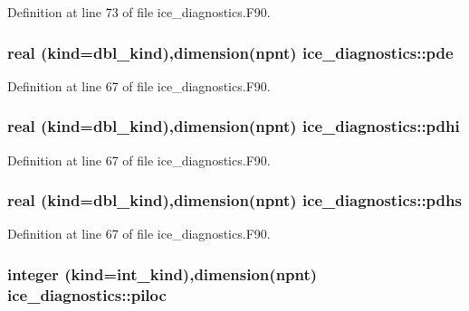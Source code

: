 Definition at line 73 of file ice\_\-diagnostics.F90.\hypertarget{namespaceice__diagnostics_afaeca519ef7de2238cb47f6f1b6c3032}{
\subsubsection[{pde}]{\setlength{\rightskip}{0pt plus 5cm}real (kind=dbl\_\-kind),dimension({\bf npnt}) {\bf ice\_\-diagnostics::pde}}}
\label{namespaceice__diagnostics_afaeca519ef7de2238cb47f6f1b6c3032}


Definition at line 67 of file ice\_\-diagnostics.F90.\hypertarget{namespaceice__diagnostics_ae9176a1e4ff6d526241dfbc185fef462}{
\subsubsection[{pdhi}]{\setlength{\rightskip}{0pt plus 5cm}real (kind=dbl\_\-kind),dimension({\bf npnt}) {\bf ice\_\-diagnostics::pdhi}}}
\label{namespaceice__diagnostics_ae9176a1e4ff6d526241dfbc185fef462}


Definition at line 67 of file ice\_\-diagnostics.F90.\hypertarget{namespaceice__diagnostics_aafb0c3e7a68ebfdd564e56305618c799}{
\subsubsection[{pdhs}]{\setlength{\rightskip}{0pt plus 5cm}real (kind=dbl\_\-kind),dimension({\bf npnt}) {\bf ice\_\-diagnostics::pdhs}}}
\label{namespaceice__diagnostics_aafb0c3e7a68ebfdd564e56305618c799}


Definition at line 67 of file ice\_\-diagnostics.F90.\hypertarget{namespaceice__diagnostics_a1b77eb5ad27f3307cbff090ad8011f0a}{
\subsubsection[{piloc}]{\setlength{\rightskip}{0pt plus 5cm}integer (kind=int\_\-kind),dimension({\bf npnt}) {\bf ice\_\-diagnostics::piloc}}}
\label{namespaceice__diagnostics_a1b77eb5ad27f3307cbff090ad8011f0a}


